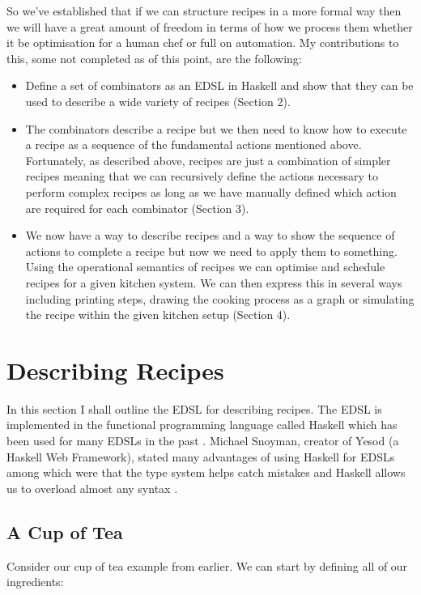 \documentclass[11pt]{article}
\begin{document}
    So we've established that if we can structure recipes in a more
    formal way then we will have a great amount of freedom in terms
    of how we process them whether it be optimisation for a human
    chef or full on automation. My contributions to this, some not
    completed as of this point, are the following:

    \begin{itemize}
        \item Define a set of combinators as an EDSL in Haskell and show that
        they can be used to describe a wide variety of recipes (Section 2).

        \item The combinators describe a recipe but we then need to know
        how to execute a recipe as a sequence of the fundamental actions
        mentioned above. Fortunately, as described above, recipes are just
        a combination of simpler recipes meaning that we can recursively
        define the actions necessary to perform complex recipes as long
        as we have manually defined which action are required for each
        combinator (Section 3).

        \item We now have a way to describe recipes and a way to show the
        sequence of actions to complete a recipe but now we need to apply
        them to something. Using the operational semantics of recipes
        we can optimise and schedule recipes for a given kitchen system.
        We can then express this in several ways including printing steps,
        drawing the cooking process as a graph or simulating the recipe
        within the given kitchen setup (Section 4).
    \end{itemize}

    \section{Describing Recipes}
    In this section I shall outline the EDSL for describing recipes.
    The EDSL is implemented in the functional programming language
    called Haskell which has been used for many EDSLs in the past \cite{hudak}.
    Michael Snoyman, creator of Yesod (a Haskell Web Framework), stated
    many advantages of using Haskell for EDSLs among which were that
    the type system helps catch mistakes and Haskell allows us to
    overload almost any syntax \cite{snoyman}.

    \subsection{A Cup of Tea}
    Consider our cup of tea example from earlier. We can start by
    defining all of our ingredients:
\end{document}
